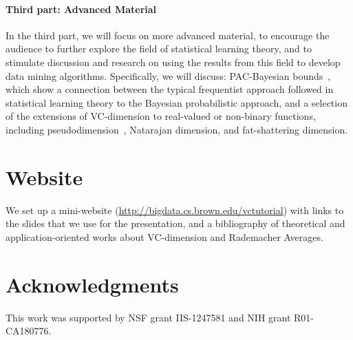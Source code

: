 \documentclass{sig-alternate-2013}
\begin{document}
\paragraph*{Third part: Advanced Material} In the third part, we will focus on more
advanced material, to encourage the audience to further explore the field of
statistical learning theory, and to stimulate discussion and research on using
the results from this field to develop data mining algorithms. Specifically, we
will discuss: PAC-Bayesian bounds~\citep{BoucheronBL05,ShalevSBD14}, which show
a connection between the typical frequentist approach followed in statistical
learning theory to the Bayesian probabilistic approach, and a selection of the
extensions of VC-dimension to real-valued or non-binary functions, including
pseudodimension~\citep{Pollard84}, Natarajan dimension, and fat-shattering
dimension.

\section{Website}\label{sec:website}
We set up a mini-website (\url{http://bigdata.cs.brown.edu/vctutorial}) with
links to the slides that we use for the presentation, and a bibliography of
theoretical and application-oriented works about VC-dimension and Rademacher
Averages.

\section{Acknowledgments}\label{sec:ack}
This work was supported by NSF grant IIS-1247581 and NIH grant R01-CA180776.
\end{document}

